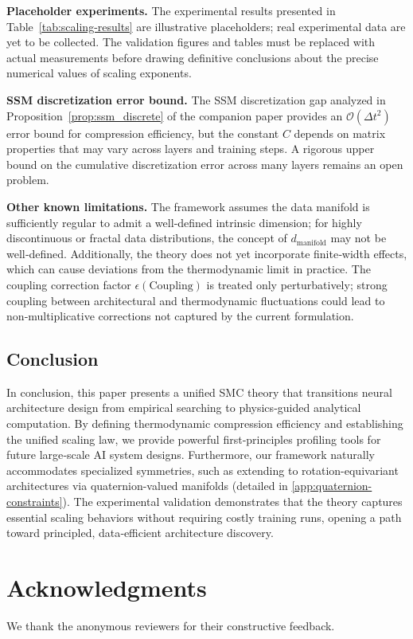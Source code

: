\documentclass[11pt, a4paper]{article}
\theoremstyle{definition}
\begin{document}
\textbf{Placeholder experiments.} The experimental results presented in Table~\ref{tab:scaling-results} are illustrative placeholders; real experimental data are yet to be collected. The validation figures and tables must be replaced with actual measurements before drawing definitive conclusions about the precise numerical values of scaling exponents.

\textbf{SSM discretization error bound.} The SSM discretization gap analyzed in Proposition~\ref{prop:ssm_discrete} of the companion paper provides an $\mathcal{O}(\Delta t^2)$ error bound for compression efficiency, but the constant $C$ depends on matrix properties that may vary across layers and training steps. A rigorous upper bound on the cumulative discretization error across many layers remains an open problem.

\textbf{Other known limitations.} The framework assumes the data manifold is sufficiently regular to admit a well‑defined intrinsic dimension; for highly discontinuous or fractal data distributions, the concept of $d_{\text{manifold}}$ may not be well‑defined. Additionally, the theory does not yet incorporate finite‑width effects, which can cause deviations from the thermodynamic limit in practice. The coupling correction factor $\epsilon(\text{Coupling})$ is treated only perturbatively; strong coupling between architectural and thermodynamic fluctuations could lead to non‑multiplicative corrections not captured by the current formulation.

\subsection{Conclusion}
In conclusion, this paper presents a unified SMC theory that transitions neural architecture design from empirical searching to physics‑guided analytical computation. By defining thermodynamic compression efficiency and establishing the unified scaling law, we provide powerful first‑principles profiling tools for future large‑scale AI system designs. Furthermore, our framework naturally accommodates specialized symmetries, such as extending to rotation-equivariant architectures via quaternion-valued manifolds (detailed in \cref{app:quaternion-constraints}). The experimental validation demonstrates that the theory captures essential scaling behaviors without requiring costly training runs, opening a path toward principled, data‑efficient architecture discovery.

\section*{Acknowledgments}
We thank the anonymous reviewers for their constructive feedback. 
\end{document}
